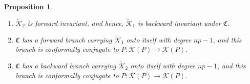 \documentclass[JEP,XML,SOM,Unicode,NoFloatCountersInSection,published]{cedram}
\newtheorem{proposition}[lemma]{Proposition}
\theoremstyle{definition}
\theoremstyle{remark}
\begin{document}
\skpt
\begin{proposition}\label{lifted_ne_dyn_prop}
\begin{enumerate}
\item $\widetilde{\mathcal{K}}_2$ is forward invariant, and hence, $\widetilde{\mathcal{K}}_1$ is backward invariant under $\mathfrak{C}$.

\item $\mathfrak{C}$ has a forward branch carrying $\widetilde{\mathcal{K}}_1$ onto itself with degree $np-1$, and this branch is conformally conjugate to $P:\mathcal{K}(P)\to \mathcal{K}(P)$.

\item $\mathfrak{C}$ has a backward branch carrying $\widetilde{\mathcal{K}}_2$ onto itself with degree $np-1$, and this branch is conformally conjugate to $P:\mathcal{K}(P)\to \mathcal{K}(P)$.
\end{enumerate}
\end{proposition}
\end{document}
